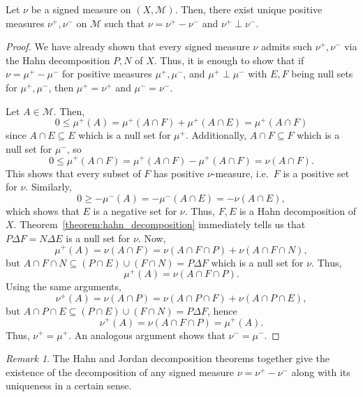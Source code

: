 \documentclass[11pt]{article}
\newcommand{\M}{\mathcal{M}}
\theoremstyle{definition}
\theoremstyle{remark}
\newtheorem*{remark}{Remark}
\begin{document}
    \begin{theorem}\label{theorem:jordan_decomposition}
        Let $\nu$ be a signed measure on $(X, \M)$. Then, there exist unique positive
        measures $\nu^+, \nu^-$ on $\M$ such that $\nu = \nu^+ - \nu^-$ and $\nu^+
        \perp \nu^-$.
    \end{theorem}
    \begin{proof}
        We have already shown that every signed measure $\nu$ admits such $\nu^+,
        \nu^-$ via the Hahn decomposition $P, N$ of $X$. Thus, it is enough to show
        that if $\nu = \mu^+ - \mu^-$ for positive measures $\mu^+, \mu^-$, and
        $\mu^+\perp\mu^-$ with $E, F$ being null sets for $\mu^+, \mu^-$, then $\mu^+
        = \nu^+$ and $\mu^- = \nu^-$.

        Let $A \in \M$. Then, \[
            0 \leq \mu^+(A) = \mu^+(A \cap F) + \mu^+(A \cap E) = \mu^+(A \cap F)
        \] since $A \cap E \subseteq E$ which is a null set for $\mu^+$.
        Additionally, $A \cap F \subseteq F$ which is a null set for $\mu^-$, so \[
            0 \leq \mu^+(A \cap F) = \mu^+(A \cap F) - \mu^+(A \cap F) = \nu(A \cap
            F).
        \] This shows that every subset of $F$ has positive $\nu$-measure, i.e.\ $F$
        is a positive set for $\nu$. Similarly, \[
            0 \geq -\mu^-(A) = -\mu^-(A \cap E) = -\nu(A \cap E),
        \] which shows that $E$ is a negative set for $\nu$. Thus, $F, E$ is a Hahn
        decomposition of $X$. Theorem~\ref{theorem:hahn_decomposition} immediately
        tells us that $P\Delta F = N\Delta E$ is a null set for $\nu$. Now, \[
            \mu^+(A) = \nu(A \cap F) = \nu(A \cap F \cap P) + \nu(A \cap F \cap N),
        \] but $A \cap F \cap N \subseteq (P\cap E) \cup (F \cap N) = P\Delta F$
        which is a null set for $\nu$. Thus, \[
            \mu^+(A) = \nu(A \cap F \cap P).
        \] Using the same arguments, \[
            \nu^+(A) = \nu(A \cap P) = \nu(A \cap P \cap F) + \nu(A \cap P \cap E),
        \] but $A \cap P \cap E \subseteq (P \cap E) \cup (F \cap N) = P\Delta F$,
        hence \[
            \nu^+(A) = \nu(A \cap F \cap P) = \mu^+(A).
        \] Thus, $\nu^+ = \mu^+$. An analogous argument shows that $\nu^- = \mu^-$.
    \end{proof}
    \begin{remark}
        The Hahn and Jordan decomposition theorems together give the existence of the
        decomposition of any signed measure $\nu = \nu^+ - \nu^-$ along with its
        uniqueness in a certain sense.
    \end{remark}
\end{document}
